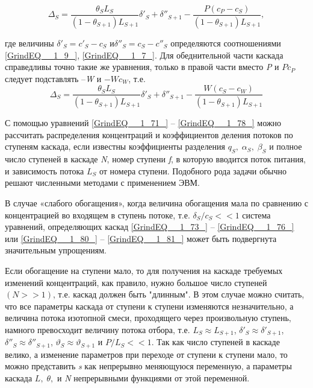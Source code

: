\begin{equation} \label{GrindEQ__1_80_} 
\Delta _{S} =\frac{\theta _{S} L_{S} }{(1-\theta _{S+1} )L_{S+1} } \delta '_{S} +\delta ''_{S+1} -\frac{P(c_{P} -c_{S} )}{(1-\theta _{S+1} )L_{S+1} } ,            
\end{equation} 

где величины $\delta '_{S} =c'_{S} -c_{S} $ и$\delta ''_{S} =c_{S} -c''_{S} $ определяются соотношениями \ref{GrindEQ__1_9_}, \ref{GrindEQ__1_7_}. Для обеднительной части каскада справедливы точно такие же уравнения, только в правой части вместо \textit{P} и $Pc_{P} $ следует подставлять --\textit{W} и $-Wc_{W} $, т.е.
\begin{equation} \label{GrindEQ__1_81_} 
\Delta _{S} =\frac{\theta _{S} L_{S} }{(1-\theta _{S+1} )L_{S+1} } \delta '_{S} +\delta ''_{S+1} -\frac{W(c_{S} -c_{W} )}{(1-\theta _{S+1} )L_{S+1} }  
\end{equation} 

С помощью уравнений \ref{GrindEQ__1_71_} -- \ref{GrindEQ__1_78_} можно рассчитать распределения концентраций и коэффициентов деления потоков по ступеням каскада, если известны коэффициенты разделения $q_{S} ,\; \alpha _{S} ,\; \beta _{S} $ и полное число ступеней в каскаде \textit{N}, номер ступени\textit{ f}, в которую вводится поток питания, и зависимость потока $L_{S} $ от номера ступени. Подобного рода задачи обычно решают численными методами с применением ЭВМ.

В случае «слабого обогащения», когда величина обогащения мала по сравнению с концентрацией во входящем в ступень потоке, т.е. $\delta _{S} /c_{S} <<1$ система уравнений, определяющих каскад \ref{GrindEQ__1_73_} -- \ref{GrindEQ__1_76_} или \ref{GrindEQ__1_80_} -- \ref{GrindEQ__1_81_} может быть подвергнута значительным упрощениям.

Если обогащение на ступени мало, то для получения на каскаде требуемых изменений концентраций, как правило, нужно большое число ступеней $(N>>1)$, т.е. каскад должен быть "длинным". В этом случае можно считать, что все параметры каскада от ступени к ступени изменяются незначительно, а величина потока изотопной смеси, проходящего через произвольную ступень, намного превосходит величину потока отбора, т.е. $L_{S} \approx L_{S+1} $, $\delta '_{S} \approx \delta '_{S+1} $, $\delta ''_{S} \approx \delta ''_{S+1} $, $\vartheta _{S} \approx \vartheta _{S+1} $ и $P/L_{S} <<1.$ Так как число ступеней в каскаде велико, а изменение параметров при переходе от ступени к ступени мало, то можно представить \textit{s} как непрерывно меняющуюся переменную, а параметры каскада $L,\; \theta ,$ и \textit{N} непрерывными функциями от этой переменной.

